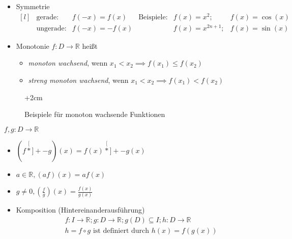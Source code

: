 \begin{definition}
\begin{itemize}
	
	\item Symmetrie
	\[
	\begin{matrix}[l]
		&\text{gerade:}		&f(-x) = f(x)	&\text{Beispiele:}	&f(x) = x^2; 	&f(x) = \cos(x) \\
		&\text{ungerade:}	&f(-x) = -f(x) &             &f(x) = x^{2n+1};	&f(x) = \sin(x)
	\end{matrix}
	\]
	
	\item Monotonie \newline \(f:D\rightarrow \mathbb{R}\) heißt
	\begin{itemize}
		\item \emph{monoton wachsend}, wenn \(x_1<x_2 \implies f(x_1) \leq f(x_2)\)
		\item \emph{streng monoton wachsend}, 
			  wenn \(x_1<x_2 \implies f(x_1) < f(x_2)\)
	\end{itemize}		
\end{itemize}

\begin{figure}[h]
	\advance\leftskip+2cm
\caption{Beispiele für monoton wachsende Funktionen}
\end{figure}

\end{definition}

\begin{definition}[Operationen]
\( f,g: D \rightarrow \mathbb{R} \)
\begin{itemize}
	\item \((f \stackrel[\ast]{+}{-} g)(x) = f(x)  \stackrel[\ast]{+}{-} g(x) \)
	\item \(a \in \mathbb{R}, (af)(x)=af(x)\)
	\item \(\displaystyle g \neq 0, \left(\frac{f}{g}\right)(x)=\frac{f(x)}{g(x)}\)
	\item 	Komposition (Hintereinanderausführung)
	\begin{align*} &f:I\rightarrow\mathbb{R};  g:D\rightarrow\mathbb{R}; g(D) \subseteq I; h:D\rightarrow\mathbb{R} \\ &h = f \circ g  \text{ ist definiert durch } h(x) = f( g(x) )
	\end{align*}
\end{itemize}

\end{definition}

